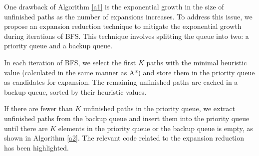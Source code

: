 \documentclass[letterpaper, 10 pt, journal, twoside]{IEEEtran}
\begin{document}

One drawback of Algorithm \ref{a1} is the exponential growth in the size of unfinished paths as the number of expansions increases. To address this issue, we propose an expansion reduction technique to mitigate the exponential growth during iterations of BFS. This technique involves splitting the queue into two: a priority queue and a backup queue.

In each iteration of BFS, we select the first $K$ paths with the minimal heuristic value (calculated in the same manner as A*) and store them in the priority queue as candidates for expansion. The remaining unfinished paths are cached in a backup queue, sorted by their heuristic values.

If there are fewer than $K$ unfinished paths in the priority queue, we extract unfinished paths from the backup queue and insert them into the priority queue until there are $K$ elements in the priority queue or the backup queue is empty, as shown in Algorithm \ref{a2}. The relevant code related to the expansion reduction has been highlighted.




\end{document}
